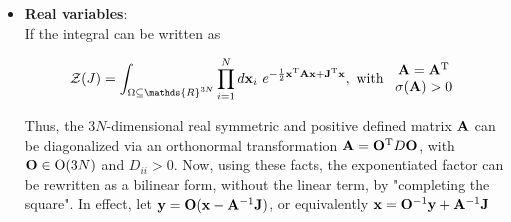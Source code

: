 \documentclass{homework}
\begin{document}
\begin{itemize}
    \item \textbf{Real variables}: \\
    
    If the integral can be written as 
    
    \begin{equation}
        \mathcal{Z}(J) = \int_{\Omega \subseteq \mathds{R}^{3N}} \prod_{i=1}^{N} d{{\bf x}}_i \blanky e^{-\frac{1}{2} {{\bf x}}^{\textnormal{T}} {{\bf A}} {{\bf x}} + {{\bf J}}^{\textnormal{T}} {{\bf x}}}, \textnormal{ with } \begin{array}{c}
            {{\bf A}} = {{\bf A}}^{\textnormal{T}} \\
            \sigma({{\bf A}}) > 0 
        \end{array}
    \end{equation}

Thus, the $3N$-dimensional real symmetric and positive defined matrix ${{{\bf A}}}$ can be diagonalized via an orthonormal transformation ${{\bf A}} = {{\bf O}}^{\textnormal{T}} D  {{\bf O}}$, with $ {{\bf O}} \in \textnormal{O}(3N)$ and $D_{ii} > 0$. Now, using these facts, the exponentiated factor can be rewritten as a bilinear form, without the linear term, by "completing the square". In effect, let ${{\bf y}} = {{\bf O} ({\bf x} - {\bf A}^{-1} {\bf J})}$, or equivalently ${\bf x} = {\bf O}^{-1} {\bf y} + {\bf A}^{-1} {\bf J}$


\end{itemize}
\end{document}
